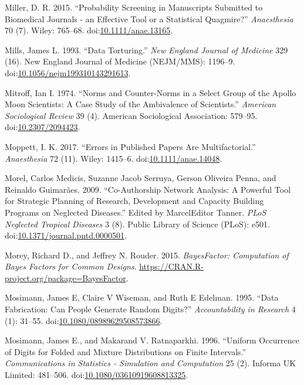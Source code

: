 \documentclass[a5paper]{book}
\begin{document}
\hypertarget{ref-doi:10.1111ux2fanae.13165}{}
Miller, D. R. 2015. ``Probability Screening in Manuscripts Submitted to
Biomedical Journals - an Effective Tool or a Statistical Quagmire?''
\emph{Anaesthesia} 70 (7). Wiley: 765--68.
doi:\href{https://doi.org/10.1111/anae.13165}{10.1111/anae.13165}.

\hypertarget{ref-doi:10.1056ux2fnejm199310143291613}{}
Mills, James L. 1993. ``Data Torturing.'' \emph{New England Journal of
Medicine} 329 (16). New England Journal of Medicine (NEJM/MMS): 1196--9.
doi:\href{https://doi.org/10.1056/nejm199310143291613}{10.1056/nejm199310143291613}.

\hypertarget{ref-doi:10.2307ux2f2094423}{}
Mitroff, Ian I. 1974. ``Norms and Counter-Norms in a Select Group of the
Apollo Moon Scientists: A Case Study of the Ambivalence of Scientists.''
\emph{American Sociological Review} 39 (4). American Sociological
Association: 579--95.
doi:\href{https://doi.org/10.2307/2094423}{10.2307/2094423}.

\hypertarget{ref-doi:10.1111ux2fanae.14048}{}
Moppett, I. K. 2017. ``Errors in Published Papers Are Multifactorial.''
\emph{Anaesthesia} 72 (11). Wiley: 1415--6.
doi:\href{https://doi.org/10.1111/anae.14048}{10.1111/anae.14048}.

\hypertarget{ref-doi:10.1371ux2fjournal.pntd.0000501}{}
Morel, Carlos Medicis, Suzanne Jacob Serruya, Gerson Oliveira Penna, and
Reinaldo Guimarães. 2009. ``Co-Authorship Network Analysis: A Powerful
Tool for Strategic Planning of Research, Development and Capacity
Building Programs on Neglected Diseases.'' Edited by MarcelEditor
Tanner. \emph{PLoS Neglected Tropical Diseases} 3 (8). Public Library of
Science (PLoS): e501.
doi:\href{https://doi.org/10.1371/journal.pntd.0000501}{10.1371/journal.pntd.0000501}.

\hypertarget{ref-bf}{}
Morey, Richard D., and Jeffrey N. Rouder. 2015. \emph{BayesFactor:
Computation of Bayes Factors for Common Designs}.
\url{https://CRAN.R-project.org/package=BayesFactor}.

\hypertarget{ref-doi:10.1080ux2f08989629508573866}{}
Mosimann, James E, Claire V Wiseman, and Ruth E Edelman. 1995. ``Data
Fabrication: Can People Generate Random Digits?'' \emph{Accountability
in Research} 4 (1): 31--55.
doi:\href{https://doi.org/10.1080/08989629508573866}{10.1080/08989629508573866}.

\hypertarget{ref-doi:10.1080ux2f03610919608813325}{}
Mosimann, James E., and Makarand V. Ratnaparkhi. 1996. ``Uniform
Occurrence of Digits for Folded and Mixture Distributions on Finite
Intervals.'' \emph{Communications in Statistics - Simulation and
Computation} 25 (2). Informa UK Limited: 481--506.
doi:\href{https://doi.org/10.1080/03610919608813325}{10.1080/03610919608813325}.
\end{document}
